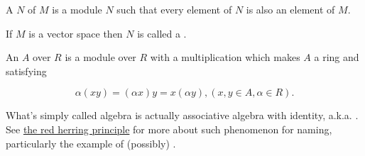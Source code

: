 \begin{remark}
    \label{mk:Submodule}

    A  $N$ of $M$ is a module $N$ such that every element of $N$ is also an element of $M$.

    If $M$ is a vector space then $N$ is called a .

\end{remark}





    

\begin{definition}[Algebra]
    \label{Algebra}
    \leanok

    An  $A$ over $R$ is a module over $R$ with a multiplication which makes $A$ a ring and satisfying

    $$
    \alpha(x y)=(\alpha x) y=x(\alpha y),(x, y \in A, \alpha \in R) .
    $$

\end{definition}

\begin{remark}
    \label{mk:Algebra}

    What's simply called algebra is actually associative algebra with identity, a.k.a. . See
    \href{https://ncatlab.org/nlab/show/red%20herring%20principle}{the red herring principle}
    for more about such phenomenon for naming, particularly the example of (possibly) .
    
\end{remark}

